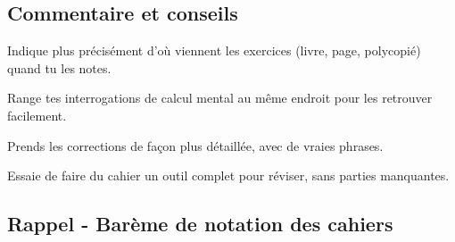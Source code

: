 \documentclass[answers]{exam}
\begin{document}
\subsection*{Commentaire et conseils}

\begin{tcolorbox}[
  colback=blue!5!white,
  colframe=blue!70!black,
  title=Commentaire plus détaillé,
  fonttitle=\bfseries,
  boxsep=4pt,
  sharp corners,
]
\begin{compactitem}
  \item Indique plus précisément d'où viennent les exercices (livre, page, polycopié) quand tu les notes.
  \item Range tes interrogations de calcul mental au même endroit pour les retrouver facilement.
  \item Prends les corrections de façon plus détaillée, avec de vraies phrases.
  \item Essaie de faire du cahier un outil complet pour réviser, sans parties manquantes.
\end{compactitem}
\end{tcolorbox}



\subsection*{Rappel - Barème de notation des cahiers}

\renewcommand{\arraystretch}{1.7}
\end{document}
